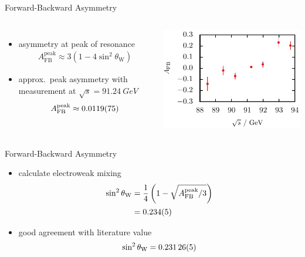 \documentclass[11pt,xcolor=dvipsnames,professionalfonts]{beamer}
\begin{document}
\begin{frame}{Forward-Backward Asymmetry}
	\begin{columns}
		\begin{itemize}
			\setlength\itemsep{1.5em}
			\item<2-> asymmetry at peak of resonance
			\begin{align*}
				A_\mathrm{FB}^\mathrm{peak} \approx 3\left( 1 - 4 \sin^2\theta_\mathrm{W} \right)
			\end{align*}
			
			\item<3-> approx.\ peak asymmetry with measurement at $\sqrt{s} = \SI{91.24}{GeV}$
			\begin{align*}
			A_\mathrm{FB}^\mathrm{peak} \approx \num{0.0119 +- 0.0075}
			\end{align*}
		\end{itemize}
			\begin{center}
				\includegraphics{./talkfigs/pdf/afb.pdf}
			\end{center}
	\end{columns}

\end{frame}

\begin{frame}{Forward-Backward Asymmetry}
		\begin{itemize}
			\setlength\itemsep{1.5em}
			\item calculate electroweak mixing
			\begin{align*}
			\sin^2\theta_\mathrm{W} &= \frac{1}{4} \left( 1 - \sqrt{A_\mathrm{FB}^\mathrm{peak} / 3} \right) \\[0.1em]
			&= \num{0.234 +- 0.005}
			\end{align*}
			
			\item<2-> good agreement with literature value \cite{pdg}
			\begin{align*}
				\sin^2\theta_\mathrm{W} = \num{0.23126 +- 0.00005}
			\end{align*}
			
			
		\end{itemize}
\end{frame}
\end{document}
